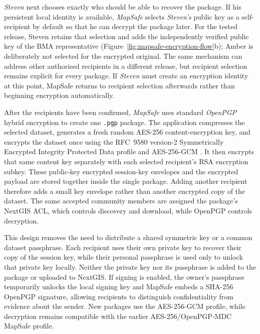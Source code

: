 \documentclass[]{interact}
\begin{document}
\textit{Steven} next chooses exactly who should be able to recover the package. If his persistent local identity is available, \textit{MapSafe} selects \textit{Steven's} public key as a self-recipient by default so that he can decrypt the package later. For the tested release, Steven retains that selection and adds the independently verified public key of the BMA representative (Figure~\ref{fig:mapsafe-encryption-flow}b); Amber is deliberately not selected for the encrypted original. The same mechanism can address other authorised recipients in a different release, but recipient selection remains explicit for every package. If \textit{Steven} must create an encryption identity at this point, MapSafe returns to recipient selection afterwards rather than beginning encryption automatically.

After the recipients have been confirmed, \textit{MapSafe} uses standard \textit{OpenPGP} hybrid encryption to create one \texttt{.pgp} package. The application compresses the selected dataset, generates a fresh random AES-256 content-encryption key, and encrypts the dataset once using the RFC~9580 version-2 Symmetrically Encrypted Integrity Protected Data profile and AES-256-GCM \citep{wouters2024openpgp}. It then encrypts that same content key separately with each selected recipient's RSA encryption subkey. These public-key encrypted session-key envelopes and the encrypted payload are stored together inside the single package. Adding another recipient therefore adds a small key envelope rather than another encrypted copy of the dataset. The same accepted community members are assigned the package's NextGIS ACL,
which controls discovery and download, while OpenPGP controls decryption.

This design removes the need to distribute a shared symmetric key or a common dataset passphrase. Each recipient uses their own private key to recover their copy of the session key, while their personal passphrase is used only to unlock that private key locally. Neither the private key nor its passphrase is added to the package or uploaded to NextGIS. If signing is enabled, the owner's passphrase temporarily unlocks the local signing key and MapSafe embeds a SHA-256 OpenPGP signature, allowing recipients to distinguish confidentiality from evidence about the sender. New packages use the AES-256-GCM profile, while decryption remains compatible with the earlier AES-256/OpenPGP-MDC MapSafe profile.


\end{document}
